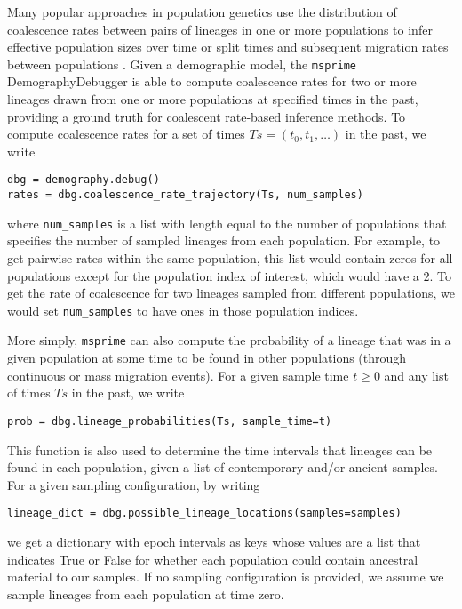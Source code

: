 Many popular approaches in population genetics use the distribution of coalescence rates between 
pairs of lineages in one or more populations to infer effective population sizes over time 
\cite{li2011inference,sheehan2013estimating,schiffels2014inferring}
or split times 
and subsequent migration rates between populations 
\cite{wang2020tracking}.
Given a demographic model, the 
\texttt{msprime} DemographyDebugger is able to compute coalescence rates for two or more lineages drawn 
from one or more populations at specified times in the past, providing a ground truth for coalescent rate-based 
inference methods. To compute coalescence rates for a set of times $Ts=(t_0, t_1, \ldots)$ in the 
past, we write
\begin{lstlisting}[frame=single]
dbg = demography.debug()
rates = dbg.coalescence_rate_trajectory(Ts, num_samples)
\end{lstlisting}
where \texttt{num_samples} is a list with length equal to the number of populations that
specifies the number of sampled lineages from each population. For example, 
to get pairwise rates within the same 
population, this list would contain zeros for all populations except for the population index of interest, 
which would have a $2$. To get the rate of coalescence for two lineages sampled from different 
populations, we would set \texttt{num_samples} to have ones in those population indices.

More simply, \texttt{msprime} can also compute the probability of a lineage that was in a given
population at some time to be found in other populations (through continuous or mass migration events). 
For a given sample time $t\geq0$ and any list of times $Ts$ in the past, we write
\begin{lstlisting}[frame=single]
prob = dbg.lineage_probabilities(Ts, sample_time=t)
\end{lstlisting}
This function is also used to determine the time intervals that lineages can be found in each population,
given a list of contemporary and/or ancient samples. For a given sampling configuration, by writing
\begin{lstlisting}[frame=single]
lineage_dict = dbg.possible_lineage_locations(samples=samples)
\end{lstlisting}
we get a dictionary with epoch intervals as keys whose values are a list that indicates True or False for 
whether each population could contain ancestral material to our samples.
If no sampling configuration is provided, we assume we sample lineages from each population at time zero.
